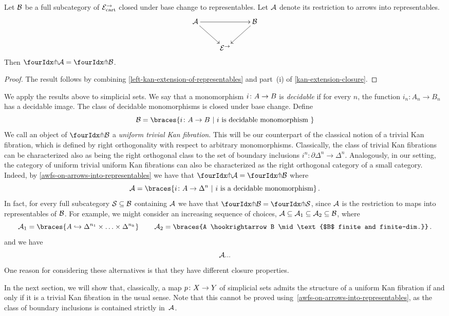 \documentclass[reqno,10pt,a4paper,oneside]{amsart}
\begin{document}
\begin{proposition}
\label{awfs-on-arrows-into-representables}
Let $\cal{B}$ be a full subcategory of $\catE_{\cart}^{\to}$ closed under base change to representables.
Let $\cal{A}$ denote its restriction to arrows into representables.
\[
\xymatrix{
  \cal{A}
  \ar[rr]
  \ar[dr]
&&
  \cal{B}
  \ar[dl]
\\&
  \catE^{\to}
}
\]
Then $\liftr{\cal{A}} = \liftr{\cal{B}}$.
\end{proposition}

\begin{proof} The result follows by combining \cref{left-kan-extension-of-representables} and part~(i) of \cref{kan-extension-closure}. 
\end{proof}



\begin{example}\label{monos-into-representables} \label{decidable-monos-into-representables}
We apply the results above to simplicial sets. We say that a monomorphism $i \co A \to B$ is 
 \emph{decidable} if for every $n$, the function $i_n : A_n \to B_n$ has a decidable image. 
 The class of decidable monomorphisms is closed under base change. Define 
 \[
\cal{B}  = \braces{ i \co A \rightarrow B \ | \ i  \text{ is  decidable monomorphism } }
\]
We call an object of  $\liftr{\cal{B}}$ a \emph{uniform trivial Kan fibration}. This will be our counterpart of the
 classical notion of a trivial Kan fibration, which is defined by right orthogonality with respect to arbitrary monomorphisms. 
Classically, the class of trivial Kan fibrations can be characterized also as being the right orthogonal class to the
set of boundary inclusions $i^n : \partial \Delta^n \to \Delta^n$. Analogously, in our setting, the category of uniform trivial uniform
Kan fibrations can also be characterized as the right orthogonal category of  a small category. Indeed, by  \cref{awfs-on-arrows-into-representables} we have that $\liftr{\cal{A}}  = \liftr{\cal{B}}$ where
 \[
 \cal{A} = \braces{i \co A \rightarrow \Delta^{n} \ | \ i \text{ is a  decidable monomorphism} } \, .
 \]
In fact, for every full subcategory $\cal{S} \subseteq \calB$ containing $\cal{A}$ we have that $\liftr{\cal{B}} = \liftr{\cal{S}}$,
since $\cal{A}$ is the restriction to maps into representables  of $\cal{B}$. For example, we might consider an increasing sequence of choices,
$\cal{A} \subseteq \cal{A}_1 \subseteq \cal{A}_2 \subseteq \cal{B}$, 
where 
\[ 
\cal{A}_1  = \braces{A \hookrightarrow \Delta^{n_1} \times \ldots \times \Delta^{n_k}} \,  \qquad  
\cal{A}_2  = \braces{A \hookrightarrow B \mid \text{$B$ finite and finite-dim.}} \, . 
\]
and we have
\[
\cal{A} ... 
\]
One reason for considering these alternatives is that they have different closure properties. 

In the next section, we will show that, classically, 
a map $p \co X \to Y$ of simplicial sets admits the structure of a uniform Kan fibration if and only if it is a trivial Kan fibration in the usual sense.
Note that this cannot be proved using~\cref{awfs-on-arrows-into-representables}, as the class of boundary inclusions  is contained strictly 
in~$\cal{A}$. 
\end{example}
\end{document}
